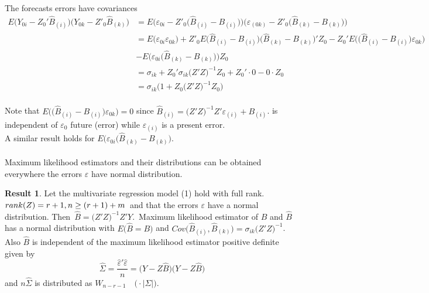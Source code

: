 \documentclass[11pt,a4paper]{article}
\theoremstyle{definition}
\newtheorem{result}[thm]{Result}
\begin{document}
The forecasts errors have covariances
\begin{align*}
E\big(Y_{0i}-Z_0'\widehat{B}_{(i)}\big)\big(Y_{0k}-Z'_0\widehat{B}_{(k)}\big) & = E\big(\varepsilon_{0i}-Z'_0\big(\widehat{B}_{(i)}-B_{(i)}\big)\big)\big(\varepsilon_{(0k)}-Z'_0\big(\widehat{B}_{(k)}-B_{(k)}\big)\big)\\
& = E\big(\varepsilon_{0i}\varepsilon_{0k}\big) + Z'_0E\big(\widehat{B}_{(i)}-B_{(i)}\big)\big(\widehat{B}_{(k)}-B_{(k)}\big)'Z_0-Z_0'E\big(\big(\widehat{B}_{(i)}-B_{(i)}\big)\varepsilon_{0k}\big)\\
& - E\big(\varepsilon_{0i}\big(\widehat{B}_{(k)}-B_{(k)}\big)\big)Z_0\\
& = \sigma_{ik}+Z_0'\sigma_{ik}\big(Z'Z\big)^{-1}Z_0+Z_0'\cdot 0-0\cdot Z_0\\
& = \sigma_{ik}\big(1+Z_0\big(Z'Z\big)^{-1}Z_0\big)\\  
\end{align*}


Note that $E\big(\big(\widehat{B}_{(i)}-B_{(i)}\big)\varepsilon_{0k}\big)=0$ since $\widehat{B}_{(i)}=\big(Z'Z\big)^{-1}Z'\varepsilon_{(i)}+B_{(i)}$.
is independent of $\varepsilon_0$ future (error) while $\varepsilon_{(i)}$ is a  present error.\\

A similar result holds for $E\big(\varepsilon_{0i}\big(\widehat{B}_{(k)}-B_{(k)}\big)$.\\\\


Maximum likelihood estimators and their distributions can be obtained everywhere the errors $\varepsilon$ have normal distribution.\\

\begin{result}
Let the multivariate regression model (1) hold with full rank. $rank (Z) = r+1,\\ n\geq (r+1)+m$\, and that the errors $\varepsilon$ have a normal distribution. Then \,$\widehat{B}=\big(Z'Z\big)^{-1}Z'Y.\,$ Maximum likelihood estimator of $B$ and $\widehat{B}$ has a normal distribution with $E\big(\widehat{B}=B\big)$ and $Cov\big(\widehat{B}_{(i)},\widehat{B}_{(k)}\big)=\sigma_{ik}\big(Z'Z\big)^{-1}$. Also $\widehat{B}$ is independent of the maximum likelihood estimator positive definite given by $$\widehat{\Sigma}=\frac{\widehat{\varepsilon}'\widehat{\varepsilon}}{n}=\big(Y-Z\widehat{B}\big)\big(Y-Z\widehat{B}\big)$$ and $\displaystyle{n\widehat{\Sigma}}$ is distributed as $W_{n-r-1}\quad  \Big(\cdot \big|\displaystyle{\Sigma}\big|\Big)$.\\\\
\end{result}
\end{document}

